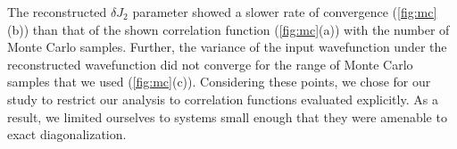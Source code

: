 \documentclass[amsmath,amssymb,aps,prb,superscriptaddress,onecolumn,floatfix]{revtex4}
\begin{document}
The reconstructed $\delta J_2$ parameter showed a slower rate of convergence (\autoref{fig:mc}(b)) than that of the shown correlation function (\autoref{fig:mc}(a)) with the number of Monte Carlo samples.
Further, the variance of the input wavefunction under the reconstructed wavefunction did not converge for the range of Monte Carlo samples that we used (\autoref{fig:mc}(c)).
Considering these points, we chose for our study to restrict our analysis to correlation functions evaluated explicitly. As a result, we limited ourselves to systems small enough that they were amenable to exact diagonalization.



    
\end{document}
